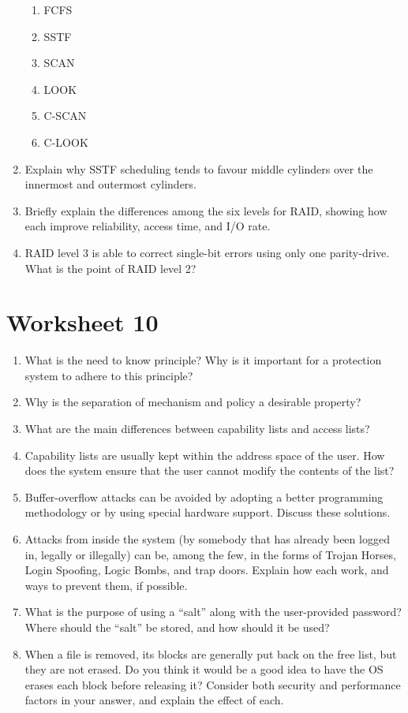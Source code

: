\documentclass{article}
\begin{document}
\begin{enumerate}
		\begin{enumerate}
			\item FCFS
			\item SSTF
			\item SCAN
			\item LOOK
			\item C-SCAN
			\item C-LOOK
		\end{enumerate}
		\item Explain why SSTF scheduling tends to favour middle cylinders over the innermost and outermost cylinders.
		\item Briefly explain the differences among the six levels for RAID, showing how each improve reliability, access time, and I/O rate.
		\item RAID level 3 is able to correct single-bit errors using only one parity-drive. What is the point of RAID level 2?
	\end{enumerate}
	\section{Worksheet 10}
	\begin{enumerate}
		\item What is the need to know principle? Why is it important for a protection system to adhere to this principle?
		\item Why is the separation of mechanism and policy a desirable property?
		\item What are the main differences between capability lists and access lists?
		\item Capability lists are usually kept within the address space of the user. How does the system ensure that the user cannot modify the contents of the list?
		\item Buffer-overflow attacks can be avoided by adopting a better programming methodology or by using special hardware support. Discuss these solutions.
		\item Attacks from inside the system (by somebody that has already been logged in, legally or illegally) can be, among the few, in the forms of Trojan Horses, Login Spoofing, Logic Bombs, and trap doors. Explain how each work, and ways to prevent them, if possible.
		\item What is the purpose of using a “salt” along with the user-provided password? Where should the “salt” be stored, and how should it be used?
		\item When a file is removed, its blocks are generally put back on the free list, but they are not erased. Do you think it would be a good idea to have the OS erases each block before releasing it? Consider both security and performance factors in your answer, and explain the effect of each.
	\end{enumerate}
\end{document}
